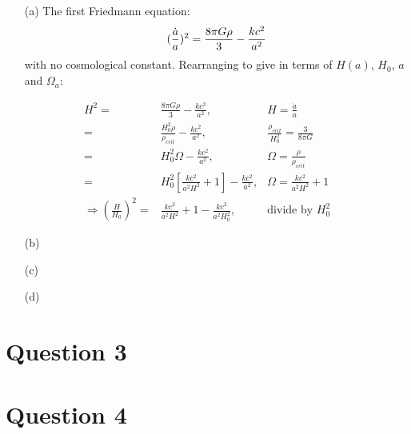 \documentclass[10pt,a4paper]{article}
\begin{document}
\begin{itemize}
	\item[(a)] The first Friedmann equation:
	\begin{equation}
		(\frac{\dot a}{a})^{2} = \frac{8 \pi G \rho}{3} - \frac{kc^{2}}{a^{2}} \\
	\end{equation}
	with no cosmological constant. Rearranging to give in terms of $H(a)$, $H_{0}$, $a$ and $\Omega_{a}$:
\end{itemize}
\begin{eqnarray}
	H^{2} =& \frac{8 \pi G \rho}{3} - \frac{kc^{2}}{a^{2}}, &H = \frac{\dot a}{a} \\
	  =& \frac{H_{0}^{2} \rho}{\rho_{crit}} - \frac{kc^{2}}{a^{2}}, &\frac{\rho_{crit}}{H_{0}^{2}} = \frac{3}{8 \pi G} \\
	  =& H_{0}^{2}\Omega - \frac{kc^{2}}{a^{2}}, &\Omega = \frac{\rho}{\rho_{crit}} \\
	  =& H_{0}^{2}[\frac{kc^{2}}{a^{2}H^{2}} + 1] - \frac{kc^{2}}{a^{2}}, & \Omega = \frac{kc^{2}}{a^{2}H^{2}} + 1 \\
	\Rightarrow (\frac{H}{H_{0}})^{2} =& \frac{kc^{2}}{a^{2}H^{2}} + 1 - \frac{kc^{2}}{a^{2}H_{0}^{2}}, &\mbox{divide by $H_{0}^{2}$}
\end{eqnarray}
\begin{itemize}
	\item[(b)] 
	\item[(c)] 
	\item[(d)] 
\end{itemize}

\section*{Question 3}
\section*{Question 4}
\end{document}
